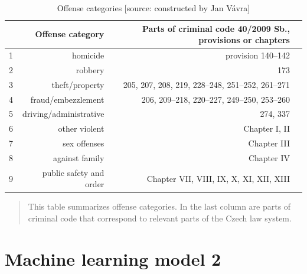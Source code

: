 \documentclass[12pt, twoside,openany]{book} %
\begin{document}
\begin{table} [H]
\centering
\begin{tabular}{lrrr}
  \hline
   & Offense category & Parts of criminal code 40/2009 Sb., provisions or chapters  \\ 
  \hline
 1 & homicide & provision 140–142 \\ 
   2 & robbery & 173 \\ 
   3 & theft/property & 205, 207, 208, 219, 228–248, 251–252, 261–271 \\ 
   4 & fraud/embezzlement & 206, 209–218, 220–227, 249–250, 253–260 \\ 
   5 & driving/administrative & 274, 337 \\ 
   6 & other violent & Chapter I, II \\ 
   7 & sex offenses & Chapter III \\ 
   8 & against family & Chapter IV \\ 
   9 & public safety and order & Chapter VII, VIII, IX, X, XI, XII, XIII \\ 

     \hline
\end{tabular}

 \caption{Offense categories [source: constructed by Jan Vávra]}
\medskip
{\small 
\begin{quotation}This table summarizes offense categories. In the last column are parts of criminal code that correspond to relevant parts of the Czech law system.

\end{quotation}
}
\end{table}












\section{Machine learning model 2}     %
\end{document}
